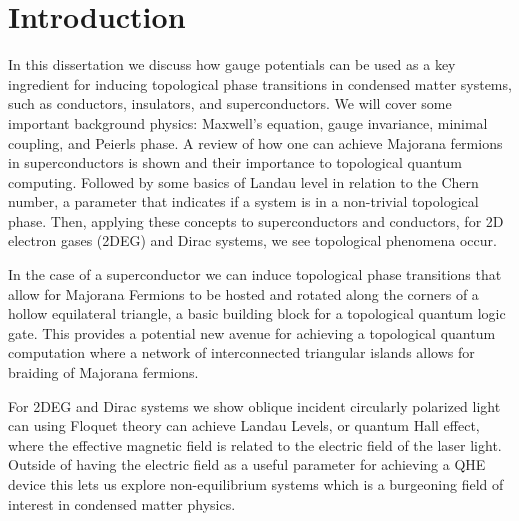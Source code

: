 \section{Introduction}

In this dissertation we discuss how gauge potentials can be used as a key ingredient for inducing topological phase transitions in condensed matter systems, such as conductors, insulators, and superconductors.
We will cover some important background physics: Maxwell's equation, gauge invariance, minimal coupling, and Peierls phase.
A review of how one can achieve Majorana fermions in superconductors is shown and their importance to topological quantum computing.
Followed by some basics of Landau level in relation to the Chern number, a parameter that indicates if a system is in a non-trivial topological phase.
Then, applying these concepts to superconductors and conductors, for 2D electron gases (2DEG) and Dirac systems, we see topological phenomena occur.

In the case of a superconductor we can induce topological phase transitions that allow for Majorana Fermions to be hosted and rotated along the corners of a hollow equilateral triangle, a basic building block for a topological quantum logic gate.
This provides a potential new avenue for achieving a topological quantum computation where a network of interconnected triangular islands allows for braiding of Majorana fermions.

For 2DEG and Dirac systems we show oblique incident circularly polarized light can using Floquet theory can achieve Landau Levels, or quantum Hall effect, where the effective magnetic field is related to the electric field of the laser light.
Outside of having the electric field as a useful parameter for achieving a QHE device this lets us explore non-equilibrium systems which is a burgeoning field of interest in condensed matter physics.
